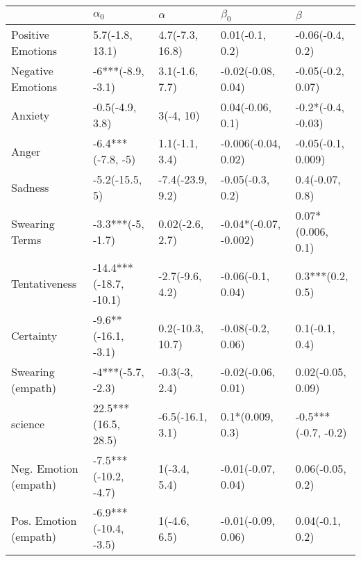 \begin{tabular}{lllll}
\toprule
{} &              $\alpha_0$ &          $\alpha$ &              $\beta_0$ &              $\beta$ \\
\midrule
Positive Emotions     &         5.7(-1.8, 13.1) &   4.7(-7.3, 16.8) &        0.01(-0.1, 0.2) &     -0.06(-0.4, 0.2) \\
Negative Emotions     &       -6***(-8.9, -3.1) &    3.1(-1.6, 7.7) &     -0.02(-0.08, 0.04) &    -0.05(-0.2, 0.07) \\
Anxiety               &         -0.5(-4.9, 3.8) &         3(-4, 10) &       0.04(-0.06, 0.1) &   -0.2*(-0.4, -0.03) \\
Anger                 &       -6.4***(-7.8, -5) &    1.1(-1.1, 3.4) &    -0.006(-0.04, 0.02) &   -0.05(-0.1, 0.009) \\
Sadness               &          -5.2(-15.5, 5) &  -7.4(-23.9, 9.2) &       -0.05(-0.3, 0.2) &      0.4(-0.07, 0.8) \\
Swearing Terms        &       -3.3***(-5, -1.7) &   0.02(-2.6, 2.7) &  -0.04*(-0.07, -0.002) &    0.07*(0.006, 0.1) \\
Tentativeness         &  -14.4***(-18.7, -10.1) &   -2.7(-9.6, 4.2) &      -0.06(-0.1, 0.04) &     0.3***(0.2, 0.5) \\
Certainty             &     -9.6**(-16.1, -3.1) &  0.2(-10.3, 10.7) &      -0.08(-0.2, 0.06) &       0.1(-0.1, 0.4) \\
Swearing (empath)     &       -4***(-5.7, -2.3) &     -0.3(-3, 2.4) &     -0.02(-0.06, 0.01) &    0.02(-0.05, 0.09) \\
science               &     22.5***(16.5, 28.5) &  -6.5(-16.1, 3.1) &       0.1*(0.009, 0.3) &  -0.5***(-0.7, -0.2) \\
Neg. Emotion (empath) &    -7.5***(-10.2, -4.7) &      1(-3.4, 5.4) &     -0.01(-0.07, 0.04) &     0.06(-0.05, 0.2) \\
Pos. Emotion (empath) &    -6.9***(-10.4, -3.5) &      1(-4.6, 6.5) &     -0.01(-0.09, 0.06) &      0.04(-0.1, 0.2) \\
\bottomrule
\end{tabular}
